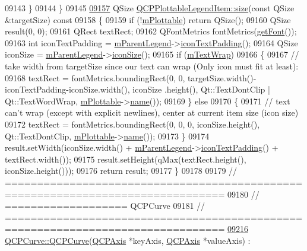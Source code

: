 \begin{DoxyCode}
09143   \}
09144 \}
09145 
\hypertarget{a00115_source_l09157}{}\hyperlink{a00048_af79ab526cc79f4ea5d9c601d139b2166}{09157} QSize \hyperlink{a00048_af79ab526cc79f4ea5d9c601d139b2166}{QCPPlottableLegendItem::size}(\textcolor{keyword}{const} QSize &targetSize)\textcolor{keyword}{ const}
09158 \textcolor{keyword}{}\{
09159   \textcolor{keywordflow}{if} (!\hyperlink{a00048_ada647fb4b22971a1a424e15b4f6af0d9}{mPlottable}) \textcolor{keywordflow}{return} QSize();
09160   QSize result(0, 0);
09161   QRect textRect;
09162   QFontMetrics fontMetrics(\hyperlink{a00048_a8a85c8a25affb4895423d730164d61de}{getFont}());
09163   \textcolor{keywordtype}{int} iconTextPadding = \hyperlink{a00023_aafcd9fc6fcb10f4a8d46037011afafe8}{mParentLegend}->\hyperlink{a00045_a9d6d07042a284c4ba5f9e3cb5c9281ef}{iconTextPadding}();
09164   QSize iconSize = \hyperlink{a00023_aafcd9fc6fcb10f4a8d46037011afafe8}{mParentLegend}->\hyperlink{a00045_a27dfb770b14adc0e8811bef8129780a5}{iconSize}();
09165   \textcolor{keywordflow}{if} (\hyperlink{a00048_a074d2372cb8954d30ff8ad533462ce96}{mTextWrap})
09166   \{
09167     \textcolor{comment}{// take width from targetSize since our text can wrap (Only icon must fit at least):}
09168     textRect = fontMetrics.boundingRect(0, 0, targetSize.width()-iconTextPadding-iconSize.width(), iconSize
      .height(), Qt::TextDontClip | Qt::TextWordWrap, \hyperlink{a00048_ada647fb4b22971a1a424e15b4f6af0d9}{mPlottable}->\hyperlink{a00024_a1affc1972938e4364a9325e4e4e4dcea}{name}());
09169   \} \textcolor{keywordflow}{else}
09170   \{
09171     \textcolor{comment}{// text can't wrap (except with explicit newlines), center at current item size (icon size)}
09172     textRect = fontMetrics.boundingRect(0, 0, 0, iconSize.height(), Qt::TextDontClip, 
      \hyperlink{a00048_ada647fb4b22971a1a424e15b4f6af0d9}{mPlottable}->\hyperlink{a00024_a1affc1972938e4364a9325e4e4e4dcea}{name}());
09173   \}
09174   result.setWidth(iconSize.width() + \hyperlink{a00023_aafcd9fc6fcb10f4a8d46037011afafe8}{mParentLegend}->\hyperlink{a00045_a9d6d07042a284c4ba5f9e3cb5c9281ef}{iconTextPadding}() + 
      textRect.width());
09175   result.setHeight(qMax(textRect.height(), iconSize.height()));
09176   \textcolor{keywordflow}{return} result;
09177 \}
09178 
09179 \textcolor{comment}{// ================================================================================}
09180 \textcolor{comment}{// =================== QCPCurve}
09181 \textcolor{comment}{// ================================================================================}
\hypertarget{a00115_source_l09216}{}\hyperlink{a00028_a36de58e2652b3fa47bdf9187d421d3ce}{09216} \textcolor{comment}{}\hyperlink{a00028_a36de58e2652b3fa47bdf9187d421d3ce}{QCPCurve::QCPCurve}(\hyperlink{a00025}{QCPAxis} *keyAxis, \hyperlink{a00025}{QCPAxis} *valueAxis) :

\end{DoxyCode}
